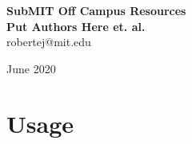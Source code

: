 \documentclass[oneside]{book}
\begin{document}
\begin{titlepage}
\begin{center}
 {\huge\bfseries SubMIT Off Campus Resources\\}
 \vspace{1.5cm}
 {\Large\bfseries Put Authors Here et. al.}\\[5pt]
 robertej@mit.edu\\[14pt]
 \vspace{2cm}


 \vfill

 \vfill
{June 2020}
\end{center}
\end{titlepage}

\tableofcontents

%    
    
%    
    
%        

\chapter{Usage}
    
    
\iffalse
\chapter{Pull Request Notes}
   


\chapter{Resources}
    
    
\fi
\end{document}
